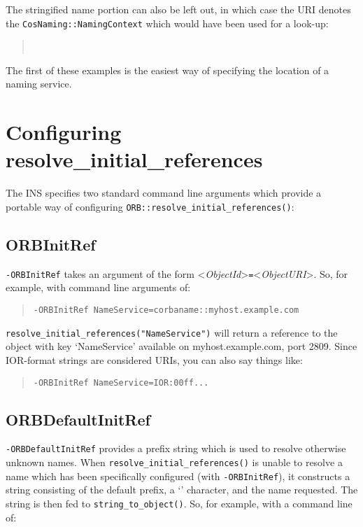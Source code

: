 \documentclass[11pt,oneside,a4paper]{book}
\newcommand{\intf}[1]{\texttt{#1}}
\newcommand{\code}[1]{\texttt{#1}}
\newcommand{\op}[1]{\texttt{#1()}}
\newcommand{\cmdline}[1]{\texttt{#1}}
\begin{document}
\noindent The stringified name portion can also be left out, in which
case the URI denotes the \intf{CosNaming::NamingContext} which would
have been used for a look-up:

\begin{quote}
\\
\end{quote}

\noindent The first of these examples is the easiest way of specifying
the location of a naming service.


\section{Configuring resolve\_initial\_references}
\label{sec:insargs}

The INS specifies two standard command line arguments which provide a
portable way of configuring \op{ORB::resolve\_initial\_references}:


\subsection{ORBInitRef}

\cmdline{-ORBInitRef} takes an argument of the form
<\textit{ObjectId}>\cmdline{=}<\textit{ObjectURI}>. So, for example,
with command line arguments of:

\begin{quote}
\cmdline{-ORBInitRef NameService=corbaname::myhost.example.com}
\end{quote}

\noindent \code{resolve\_initial\_references("NameService")} will
return a reference to the object with key `NameService' available on
myhost.example.com, port 2809. Since IOR-format strings are considered
URIs, you can also say things like:

\begin{quote}
\cmdline{-ORBInitRef NameService=IOR:00ff...}
\end{quote}


\subsection{ORBDefaultInitRef}

\cmdline{-ORBDefaultInitRef} provides a prefix string which is used to
resolve otherwise unknown names. When
\op{resolve\_initial\_references} is unable to resolve a name which
has been specifically configured (with \cmdline{-ORBInitRef}), it
constructs a string consisting of the default prefix, a `\corbauri{/}'
character, and the name requested.  The string is then fed to
\op{string\_to\_object}. So, for example, with a command line of:
\end{document}
